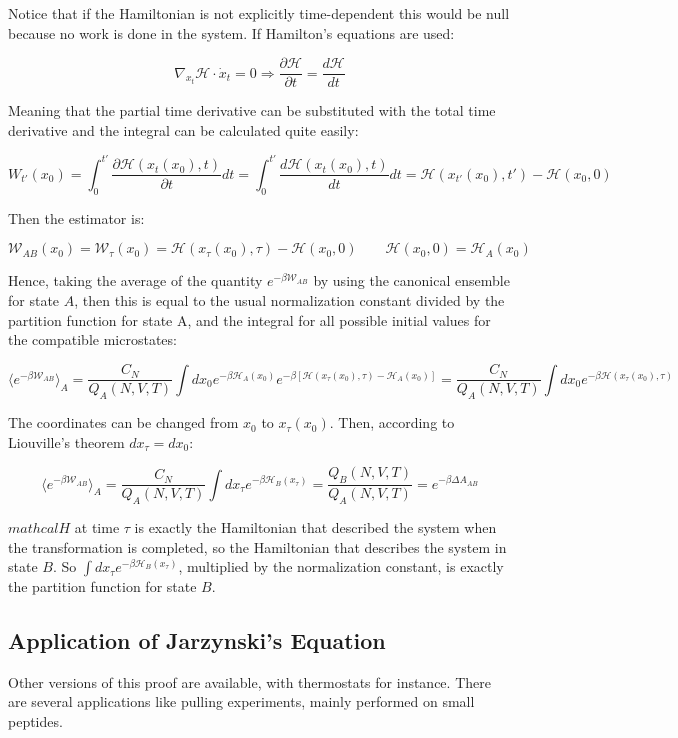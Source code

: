	Notice that if the Hamiltonian is not explicitly time-dependent this would be null because no work is done in the system.
	If Hamilton's equations are used:

	$$\nabla_{x_t}\mathcal{H}\cdot\dot{x}_t = 0\Rightarrow\frac{\partial\mathcal{H}}{\partial t} = \frac{d\mathcal{H}}{dt}$$

	Meaning that the partial time derivative can be substituted with the total time derivative and the integral can be calculated quite easily:

	$$W_{t'}(x_0) = \int_0^{t'}\frac{\partial\mathcal{H}(x_t(x_0),t)}{\partial t}dt = \int_0^{t'}\frac{d\mathcal{H}(x_t(x_0), t)}{dt}dt = \mathcal{H}(x_{t'}(x_0), t') - \mathcal{H}(x_0, 0)$$

	Then the estimator is:

	$$\mathcal{W}_{AB}(x_0) = \mathcal{W}_\tau(x_0) = \mathcal{H}(x_\tau(x_0), \tau)-\mathcal{H}(x_0,0)\qquad \mathcal{H}(x_0, 0) = \mathcal{H}_A(x_0)$$

	Hence, taking the average of the quantity $e^{-\beta\mathcal{W}_{AB}}$ by using the canonical ensemble for state $A$, then this is equal to the usual normalization constant divided by the partition function for state A, and the integral for all possible initial values for the compatible microstates:

	$$\langle e^{-\beta\mathcal{W}_{AB}}\rangle_A = \frac{C_N}{Q_A(N, V, T)}\int dx_0e^{-\beta\mathcal{H}_A(x_0)}e^{-\beta[\mathcal{H}(x_\tau(x_0), \tau)-\mathcal{H}_A(x_0)]} = \frac{C_N}{Q_A(N, V, T)}\int dx_0e^{-\beta\mathcal{H}(x_\tau(x_0), \tau)}$$

	The coordinates can be changed from $x_0$ to $x_\tau(x_0)$.
	Then, according to Liouville's theorem $dx_\tau = dx_0$:

	$$\langle e^{-\beta\mathcal{W}_{AB}}\rangle_A = \frac{C_N}{Q_A(N, V, T)}\int dx_\tau e^{-\beta\mathcal{H}_B(x_\tau)} = \frac{Q_B(N, V, T)}{Q_A(N, V, T)} = e^{-\beta\Delta A_{AB}}$$

	$mathcal{H}$ at time $\tau$ is exactly the Hamiltonian that described the system when the transformation is completed, so the Hamiltonian that describes the system in state $B$.
	So $\int dx_\tau e^{-\beta\mathcal{H}_B(x_\tau)}$, multiplied by the normalization constant, is exactly the partition function for state $B$.

	\subsection{Application of Jarzynski's Equation}
	Other versions of this proof are available, with thermostats for instance.
	There are several applications like pulling experiments, mainly performed on small peptides.

